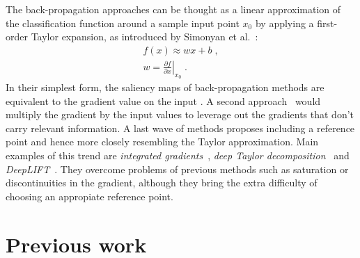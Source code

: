 \documentclass{article}
\begin{document}
The back-propagation approaches can be thought as a linear approximation of the classification function around a sample input point $x_0$ by applying a first-order Taylor expansion, as introduced by Simonyan et al.~\cite{Simonyan2014}:
\begin{align}
f(x) \approx w x + b \; , \\
w = \left. \frac{\partial f}{\partial x} \right|_{x_0} \; .
\end{align}
In their simplest form, the saliency maps of back-propagation methods are equivalent to the gradient value on the input \cite{Simonyan2014}. A second approach~\cite{Bach2015} would multiply the gradient by the input values to leverage out the gradients that don't carry relevant information. A last wave of methods proposes including a reference point and hence more closely resembling the Taylor approximation. Main examples of this trend are \textit{integrated gradients}~\cite{Sundararajan2017}, \textit{deep Taylor decomposition}~\cite{Montavon2017} and \textit{DeepLIFT}~\cite{Shrikumar2017}. They overcome problems of previous methods such as saturation or discontinuities in the gradient, although they bring the extra difficulty of choosing an appropiate reference point.

\section{Previous work}
\label{sec:prevwork}

%
\end{document}

